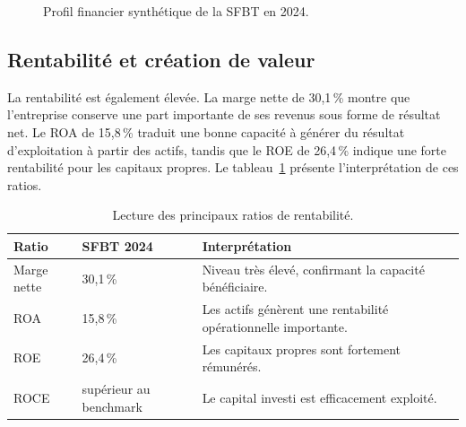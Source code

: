 \begin{figure}[H]
\centering
{}
\caption[Profil financier synthétique SFBT]{Profil financier synthétique de la SFBT en 2024.}
\label{fig:profil_financier_sfbt}
\end{figure}

\subsection{Rentabilité et création de valeur}
\par La rentabilité est également élevée. La marge nette de 30,1\,\% montre que
l'entreprise conserve une part importante de ses revenus sous forme de résultat
net. Le ROA de 15,8\,\% traduit une bonne capacité à générer du résultat
d'exploitation à partir des actifs, tandis que le ROE de 26,4\,\% indique une
forte rentabilité pour les capitaux propres. Le
tableau~\ref{tab:rentabilite_lecture} présente l'interprétation de ces ratios.

\begin{table}[H]
\centering
\caption[Lecture des ratios de rentabilité]{Lecture des principaux ratios de rentabilité.}
\label{tab:rentabilite_lecture}
\begin{tabularx}{\linewidth}{|p{3cm}|p{2.2cm}|X|}
\hline
\textbf{Ratio} & \textbf{SFBT 2024} & \textbf{Interprétation} \\ \hline
Marge nette & 30,1\,\% & Niveau très élevé, confirmant la capacité bénéficiaire. \\ \hline
ROA & 15,8\,\% & Les actifs génèrent une rentabilité opérationnelle importante. \\ \hline
ROE & 26,4\,\% & Les capitaux propres sont fortement rémunérés. \\ \hline
ROCE & supérieur au benchmark & Le capital investi est efficacement exploité. \\ \hline
\end{tabularx}
\end{table}

